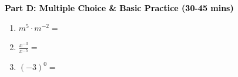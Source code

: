 \documentclass[12pt, letterpaper, fleqn]{article}
\newcommand{\blank}{\underline{\hspace{2.2cm}}}
\begin{document}
\newpage

\begin{tcolorbox}[colback=customteal!20]
\large\textcolor{black}{\textbf{Part D: Multiple Choice \& Basic Practice (30-45 mins)}}
\end{tcolorbox}

\vspace{3mm}

\begin{enumerate}[itemsep=2.5cm, leftmargin=0.6cm, resume]
\item $m^5 \cdot m^{-2} = $ \blank
\item $\frac{x^{-3}}{x^{-5}} = $ \blank
\item $(-3)^0 = $ \blank
\end{enumerate}
\end{document}
